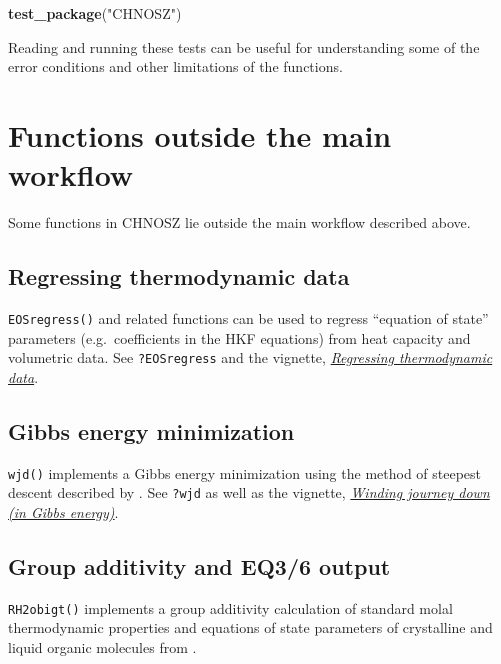 \documentclass[]{tufte-book}
\newenvironment{Shaded}{}{}
\newcommand{\KeywordTok}[1]{\textcolor[rgb]{0.00,0.44,0.13}{\textbf{#1}}}
\newcommand{\StringTok}[1]{\textcolor[rgb]{0.25,0.44,0.63}{#1}}
\newcommand{\NormalTok}[1]{#1}
\begin{document}
\begin{Shaded}
\begin{Highlighting}[]
\KeywordTok{test_package}\NormalTok{(}\StringTok{"CHNOSZ"}\NormalTok{)}
\end{Highlighting}
\end{Shaded}

Reading and running these tests can be useful for understanding some of
the error conditions and other limitations of the functions.

\chapter{Functions outside the main
workflow}\label{functions-outside-the-main-workflow}

Some functions in CHNOSZ lie outside the main workflow described above.

\section{Regressing thermodynamic
data}\label{regressing-thermodynamic-data}

{\texttt{EOSregress()}} and related functions can be used to regress
``equation of state'' parameters (e.g.~coefficients in the HKF
equations) from heat capacity and volumetric data. See
{\texttt{?EOSregress}} and the vignette,
\href{eos-regress.html}{{\emph{Regressing thermodynamic data}}}.

\section{Gibbs energy minimization}\label{gibbs-energy-minimization}

{\texttt{wjd()}} implements a Gibbs energy minimization using the method
of steepest descent described by \citet{WJD58}. See {\texttt{?wjd}} as
well as the vignette, \href{wjd.pdf}{{\emph{Winding journey down (in
Gibbs energy)}}}.

\section{Group additivity and EQ3/6
output}\label{group-additivity-and-eq36-output}

{\texttt{RH2obigt()}} implements a group additivity calculation of
standard molal thermodynamic properties and equations of state
parameters of crystalline and liquid organic molecules from
\citet{RH98}.
\end{document}
